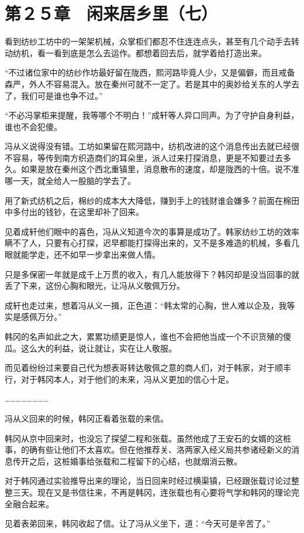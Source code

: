 \section{第２５章　闲来居乡里（七）}

看到纺纱工坊中的一架架机械，众掌柜们都忍不住连连点头，甚至有几个动手去转动纺机，看一看到底是怎么去运作。都想着回去后，就学着给打造出来。

“不过诸位家中的纺纱作坊最好留在陇西，熙河路毕竟人少，又是偏僻，而且戒备森严，外人不容易混入。放在秦州可就不一定了。若是其中的奥妙给关东的人学去了，我们可是谁也争不过。”

“不必冯掌柜来提醒，我等哪个不明白！”成轩等人异口同声。为了守护自身利益，谁也不会犯傻。

冯从义说得没有错。工坊如果留在熙河路中，纺机改进的这个消息传出去就已经很不容易，等传到南方织造商们的耳朵里，派人过来打探消息，更是不知要过去多久。如果是放在秦州这个西北重镇里，消息散布的速度，却是陇西的十倍。说不准哪一天，就全给人一股脑的学去了。

用了新式纺机之后，棉纱的成本大大降低，赚到手上的钱财谁会嫌多？前面在棉田中多付出的钱钞，在这里却补了回来。

见着成轩他们眼中的喜色，冯从义知道今次的事算是成功了。韩家纺纱工坊的效率瞒不了人，只要有心打探，迟早都能打探得出来的，又不是多难造的机械，多看几眼就能学走，还不如早一步拿出来做人情。

只是多保密一年就是成千上万贯的收入，有几人能放得下？韩冈却是没当回事的就丢了下来，这份心胸和眼光，让冯从义敬佩万分。

成轩也走过来，想着冯从义一揖，正色道：“韩太常的心胸，世人难以企及，我等实是感佩万分。”

韩冈的名声如此之大，累累功绩更是惊人，谁也不会把他当成一个不识货殖的傻瓜。这么大的利益，说让就让，实在让人敬服。

而见着纷纷过来要自己代为想表哥转达敬佩之意的商人们，对于韩家，对于顺丰行，对于韩冈本人，对于他们的未来，冯从义更加的信心十足。

……………………

冯从义回来的时候，韩冈正看着张载的来信。

韩冈从京中回来时，也没忘了探望二程和张载。虽然他成了王安石的女婿的这桩事，的确有些让他们不太喜欢。但在他推荐关、洛两家入经义局共参诸经新义的消息传开之后，这桩婚事给张载和二程留下的心结，也就烟消云散。

对于韩冈通过实验推导出来的理论，当日回来时经过横渠镇，已经跟张载讨论过整整三天。现在又是书信往来，不再是韩冈，连张载也有心要将气学和韩冈的理论完全融合起来。

见着表弟回来，韩冈收起了信。让了冯从义坐下，道：“今天可是辛苦了。”


